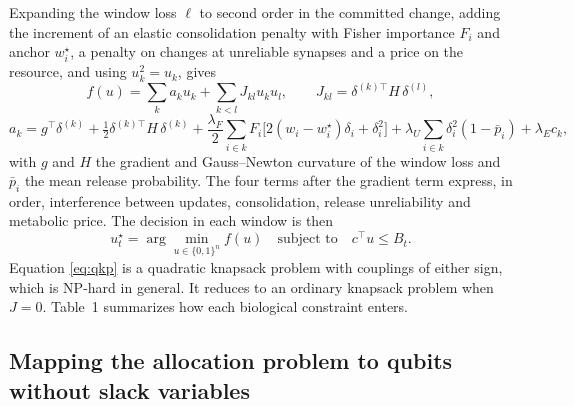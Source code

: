 \documentclass[12pt,a4paper]{article}
\begin{document}
Expanding the window loss $\ell$ to second order in the committed change, adding the increment of an elastic consolidation penalty\cite{kirkpatrick2017} with Fisher importance $F_{i}$ and anchor $w_{i}^{\star}$, a penalty on changes at unreliable synapses and a price on the resource, and using $u_{k}^{2}=u_{k}$, gives
\begin{equation}
f(u)=\sum_{k}a_{k}u_{k}+\sum_{k<l}J_{kl}u_{k}u_{l},\qquad J_{kl}=\delta^{(k)\top}H\,\delta^{(l)},
\label{eq:f}
\end{equation}
\begin{equation}
a_{k}=g^{\top}\delta^{(k)}+\tfrac{1}{2}\delta^{(k)\top}H\,\delta^{(k)}+\frac{\lambda_{F}}{2}\sum_{i\in k}F_{i}\big[2(w_{i}-w_{i}^{\star})\delta_{i}+\delta_{i}^{2}\big]+\lambda_{U}\sum_{i\in k}\delta_{i}^{2}(1-\bar p_{i})+\lambda_{E}c_{k},
\label{eq:a}
\end{equation}
with $g$ and $H$ the gradient and Gauss--Newton curvature of the window loss and $\bar p_{i}$ the mean release probability. The four terms after the gradient term express, in order, interference between updates, consolidation, release unreliability and metabolic price. The decision in each window is then
\begin{equation}
u_{t}^{\star}=\arg\min_{u\in\{0,1\}^{n}}f(u)\quad\text{subject to}\quad c^{\top}u\le B_{t}.
\label{eq:qkp}
\end{equation}
Equation \eqref{eq:qkp} is a quadratic knapsack problem with couplings of either sign, which is NP-hard in general\cite{pisinger2007}. It reduces to an ordinary knapsack problem when $J=0$. Table~1 summarizes how each biological constraint enters.

\subsection*{Mapping the allocation problem to qubits without slack variables}
\end{document}
